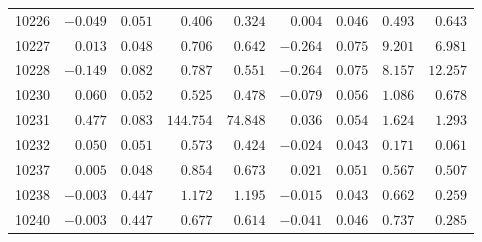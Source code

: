 \documentclass[6pt]{article}
\begin{document}
\begin{landscape}
{\begin{longtable}{lrrrrrrrr}
10226&$-0.049$&$0.051$&$   0.406$&$  0.324$&$ 0.004$&$0.046$&$  0.493$&$  0.643$\tabularnewline
10227&$ 0.013$&$0.048$&$   0.706$&$  0.642$&$-0.264$&$0.075$&$  9.201$&$  6.981$\tabularnewline
10228&$-0.149$&$0.082$&$   0.787$&$  0.551$&$-0.264$&$0.075$&$  8.157$&$ 12.257$\tabularnewline
10230&$ 0.060$&$0.052$&$   0.525$&$  0.478$&$-0.079$&$0.056$&$  1.086$&$  0.678$\tabularnewline
10231&$ 0.477$&$0.083$&$ 144.754$&$ 74.848$&$ 0.036$&$0.054$&$  1.624$&$  1.293$\tabularnewline
10232&$ 0.050$&$0.051$&$   0.573$&$  0.424$&$-0.024$&$0.043$&$  0.171$&$  0.061$\tabularnewline
10237&$ 0.005$&$0.048$&$   0.854$&$  0.673$&$ 0.021$&$0.051$&$  0.567$&$  0.507$\tabularnewline
10238&$-0.003$&$0.447$&$   1.172$&$  1.195$&$-0.015$&$0.043$&$  0.662$&$  0.259$\tabularnewline
10240&$-0.003$&$0.447$&$   0.677$&$  0.614$&$-0.041$&$0.046$&$  0.737$&$  0.285$\tabularnewline
\hline
\end{longtable}}\end{landscape}
\end{document}
